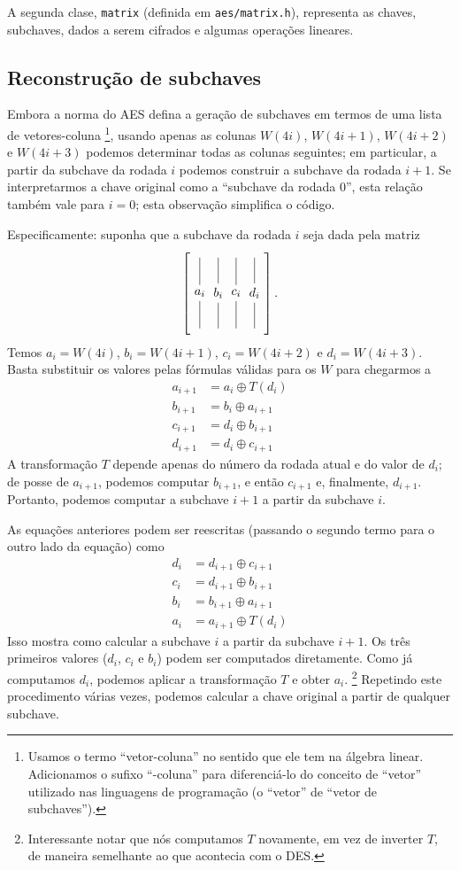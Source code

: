 \documentclass{article}
\newcommand{\xor}{\oplus}
\newcommand{\colvec}[1]{
    \tikz[baseline=-3pt]{
        \node (center) at (0, 0) {$#1$};
        \draw (center) -- (0, 1) (0, 1.2);
        \draw (center) -- (0, -1) (0, -1.2);
    }
}
\begin{document}
A segunda clase,
\verb"matrix" (definida em \verb"aes/matrix.h"),
representa as chaves, subchaves, dados a serem cifrados
e algumas operações lineares.

\subsection{Reconstrução de subchaves}

Embora a norma do AES defina a geração de subchaves em termos de
uma lista de vetores-coluna%
\footnote{
    Usamos o termo ``vetor-coluna'' no sentido que ele tem na álgebra linear.
    Adicionamos o sufixo ``-coluna'' para diferenciá-lo
    do conceito de ``vetor'' utilizado nas linguagens de programação
    (o ``vetor'' de ``vetor de subchaves'').
},
usando apenas as colunas $W(4i)$, $W(4i+1)$, $W(4i+2)$ e $W(4i+3)$
podemos determinar todas as colunas seguintes;
em particular,
a partir da subchave da rodada $i$
podemos construir a subchave da rodada $i+1$.
Se interpretarmos a chave original como a ``subchave da rodada $0$'',
esta relação também vale para $i = 0$;
esta observação simplifica o código.

Especificamente: suponha que a subchave da rodada $i$
seja dada pela matriz
\begin{equation*}
    \left[ \colvec{a_i} \colvec{b_i} \colvec{c_i} \colvec{d_i} \right].
\end{equation*}
Temos $a_i = W(4i)$, $b_i = W(4i+1)$, $c_i = W(4i+2)$ e $d_i = W(4i+3)$.
Basta substituir os valores pelas fórmulas válidas para os $W$
para chegarmos a
\begin{align*}
    a_{i+1} &= a_i \xor T(d_i) \\
    b_{i+1} &= b_i \xor a_{i+1} \\
    c_{i+1} &= d_i \xor b_{i+1} \\
    d_{i+1} &= d_i \xor c_{i+1}
\end{align*}
A transformação $T$ depende apenas do número da rodada atual e do valor de $d_i$;
de posse de $a_{i+1}$, podemos computar $b_{i+1}$,
e então $c_{i+1}$
e, finalmente, $d_{i+1}$.
Portanto, podemos computar a subchave $i+1$ a partir da subchave $i$.

As equações anteriores podem ser reescritas
(passando o segundo termo para o outro lado da equação)
como
\begin{align*}
    d_i &= d_{i+1} \xor c_{i+1} \\
    c_i &= d_{i+1} \xor b_{i+1} \\
    b_i &= b_{i+1} \xor a_{i+1} \\
    a_i &= a_{i+1} \xor T(d_i)
\end{align*}
Isso mostra como calcular a subchave $i$ a partir da subchave $i+1$.
Os três primeiros valores ($d_i$, $c_i$ e $b_i$)
podem ser computados diretamente.
Como já computamos $d_i$, podemos aplicar a transformação $T$
e obter $a_i$.
\footnote{
    Interessante notar que nós computamos $T$ novamente,
    em vez de inverter $T$,
    de maneira semelhante ao que acontecia com o DES.
}
Repetindo este procedimento várias vezes,
podemos calcular a chave original a partir de qualquer subchave.
\end{document}
